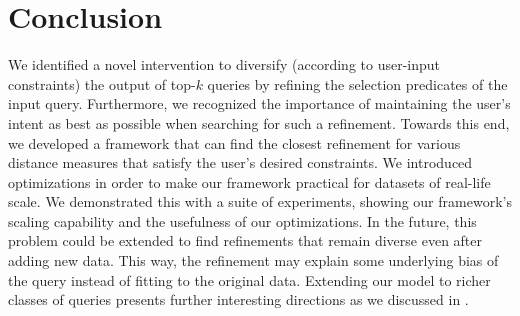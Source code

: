 \section{Conclusion}
\label{sec:conclusion}

We identified a novel intervention to diversify (according to user-input constraints) the output of top-$k$ queries by refining the selection predicates of the input query. Furthermore, we recognized the importance of maintaining the user's intent as best as possible when searching for such a refinement. Towards this end, we developed a framework that can find the closest refinement for various distance measures that satisfy the user's desired constraints. 
We introduced optimizations in order to make our framework practical for datasets of real-life scale. We demonstrated this with a suite of experiments, showing our framework's scaling capability and the usefulness of our optimizations. In the future, this problem could be extended to find refinements that remain diverse even after adding new data. This way, the refinement may explain some underlying bias of the query instead of fitting to the original data. Extending our model to richer classes of queries presents further interesting directions as we discussed in . 


